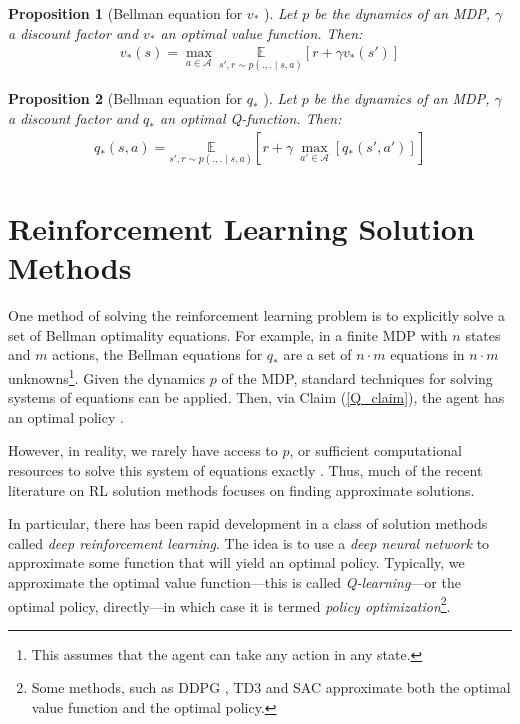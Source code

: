 \documentclass[11pt, a4paper, bibliography=totoc]{report}
\newtheorem{proposition}{Proposition}
\begin{document}
\begin{proposition}[Bellman equation for $ v_* $ {\cite[p.~63]{Sutton2018}}]
	Let $ p $ be the dynamics of an MDP, $ \gamma $ a discount factor and $ v_* $ an optimal value function. Then:
	\begin{align}
	v_*(s) = \max_{a \in \mathcal{A}} ~ \underset{s', r \sim p(., . \mid s, a)}{\mathbb{E}} \left[ r + \gamma v_*(s') \right]
	\end{align}
\end{proposition}

\begin{proposition}[Bellman equation for $ q_* $ {\cite[p.~63]{Sutton2018}}] \label{bellman_q*}
	Let $ p $ be the dynamics of an MDP, $ \gamma $ a discount factor and $ q_* $ an optimal Q-function. Then:
	\begin{align}
	q_*(s, a) = \underset{s', r \sim p(., . \mid s, a)}{\mathbb{E}} \left[ r + \gamma ~ \underset{a' \in \mathcal{A}}{\max}\left[q_*(s', a')\right] \right]
	\end{align}
\end{proposition}

\section{Reinforcement Learning Solution Methods} \label{RL_solution_methods}
One method of solving the reinforcement learning problem is to explicitly solve a set of Bellman optimality equations. For example, in a finite MDP with $ n $ states and $ m $ actions, the Bellman equations for $ q_* $ are a set of $ n\cdot m $ equations in $ n\cdot m $ unknowns\footnote{This assumes that the agent can take any action in any state.}. Given the dynamics $ p $ of the MDP, standard techniques for solving systems of equations can be applied. Then, via Claim (\ref{Q_claim}), the agent has an optimal policy \cite[p.~64]{Sutton2018}.

However, in reality, we rarely have access to $ p $, or sufficient computational resources to solve this system of equations exactly \cite[p.~66]{Sutton2018}. Thus, much of the recent literature on RL solution methods focuses on finding approximate solutions.

In particular, there has been rapid development in a class of solution methods called \textit{deep reinforcement learning}. The idea is to use a \textit{deep neural network} to approximate some function that will yield an optimal policy. Typically, we approximate the optimal value function---this is called \textit{Q-learning}---or the optimal policy, directly---in which case it is termed \textit{policy optimization}\footnote{Some methods, such as DDPG \cite{lillicrap2015continuous}, TD3 \cite{fujimoto2018addressing} and SAC \cite{haarnoja2018soft} approximate both the optimal value function and the optimal policy.}.
\end{document}
